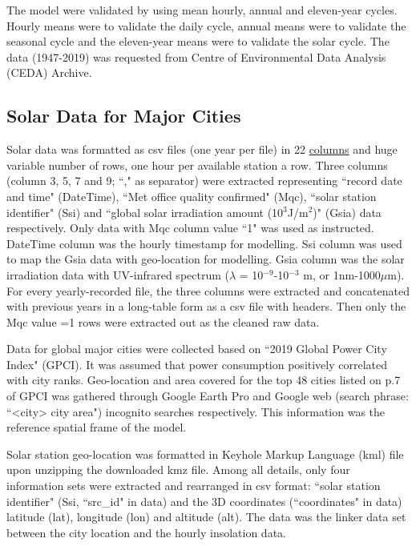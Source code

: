 \documentclass[../thesis.tex]{subfiles} %
\begin{document}
The model were validated by using mean hourly, annual and eleven-year cycles.  Hourly means were to validate the daily cycle, annual means were to validate the seasonal cycle and the eleven-year means were to validate the solar cycle.  The data (1947-2019) was requested from Centre of Environmental Data Analysis (CEDA) Archive.\autocite{solarData}

\subsection{Solar Data for Major Cities} %
Solar data was formatted as csv files (one year per file) in 22 \href{https://artefacts.ceda.ac.uk/badc_datadocs/ukmo-midas/RO_Table.html#definition}{columns} and huge variable number of rows, one hour per available station a row.  Three columns (column 3, 5, 7 and 9; ``," as separator) were extracted representing ``record date and time" (DateTime), ``Met office quality confirmed" (Mqc), ``solar station identifier" (Ssi) and ``global solar irradiation amount (10$^{3}$J/m$^{2}$)" (Gsia) data respectively.  Only data with Mqc column value ``1" was used as instructed.  DateTime column was the hourly timestamp for modelling. Ssi column was used to map the Gsia data with geo-location for modelling.  Gsia column was the solar irradiation data with UV-infrared spectrum ($\lambda$ = 10$^{-9}$-10$^{-3}$ m, or 1nm-1000$\mu$m).  For every yearly-recorded file, the three columns were extracted and concatenated with previous years in a long-table form as a csv file with headers.  Then only the Mqc value =1 rows were extracted out as the cleaned raw data.

Data for global major cities were collected based on ``2019 Global Power City Index"\autocite{GPCI2019_summary} (GPCI).  It was assumed that power consumption positively correlated with city ranks.  Geo-location and area covered for the top 48 cities listed on p.7 of GPCI was gathered through Google Earth Pro\autocite{gEarth} and Google web (search phrase: ``<city> city area") incognito searches respectively.  This information was the reference spatial frame of the model.

Solar station geo-location was formatted in Keyhole Markup Language (kml) file upon unzipping the downloaded kmz file.  Among all details, only four information sets were extracted and rearranged in csv format: ``solar station identifier" (Ssi, ``src\_id" in data) and the 3D coordinates (``coordinates" in data) latitude (lat), longitude (lon) and altitude (alt).  The data was the linker data set between the city location and the hourly insolation data.
\end{document}

